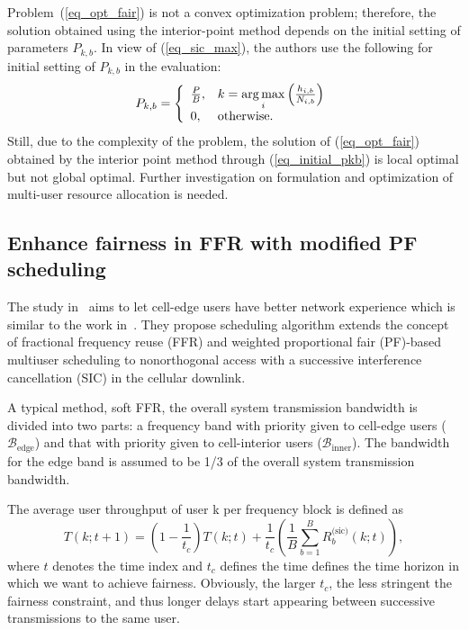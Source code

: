 Problem~(\ref{eq_opt_fair}) is not a convex optimization problem; therefore, the solution obtained using the interior-point method depends on the initial setting of parameters $P_{k,b}$. In view of (\ref{eq_sic_max}), the authors use the following for initial setting of $P_{k,b}$ in the evaluation:
\begin{equation}
\label{eq_initial_pkb}
 P_{k,b} = \left\{
  \begin{array}{l l}
    \frac{P}{B}, & k=\underset{i}{\arg\max} \left(\frac{h_{i,b}}{N_{i,b}}\right)\\
    0,     & \text{otherwise.}
  \end{array} \right.
\end{equation}
Still, due to the complexity of the problem, the solution of (\ref{eq_opt_fair}) obtained by the interior point method through (\ref{eq_initial_pkb}) is local optimal but not global optimal. Further investigation on formulation and optimization of multi-user resource allocation is needed.




\subsection{Enhance fairness in FFR with modified PF scheduling}

\label{sec_ffr_pf}
The study in~\cite{cite_docomo3} aims to let cell-edge users have better network experience 
which is similar to the work in~\cite{cite_docomo2}. 
They propose scheduling algorithm extends the concept of fractional frequency reuse (FFR) and 
weighted proportional fair (PF)-based multiuser scheduling to nonorthogonal access with a 
successive interference cancellation (SIC) in the cellular downlink. 

A typical method, soft FFR, the overall system transmission bandwidth is divided into two parts: 
a frequency band with priority given to cell-edge users ($\mathcal{B}_{\text{edge}}$) and that 
with priority given to cell-interior users ($\mathcal{B}_{\text{inner}}$). The bandwidth for the
edge band is assumed to be 1/3 of the overall system transmission bandwidth.

The average user throughput of user k per frequency block is defined as
\begin{equation}
\label{eq_avg_throughput}
T(k;t+1)=\left(1-\frac{1}{t_c}\right)T(k;t)+\frac{1}{t_c}\left(\frac{1}{B}\sum_{b=1}^{B} R^{\text{(sic)}}_b(k;t)\right),
\end{equation}
where $t$ denotes the time index and $t_c$ defines the time defines the time horizon in which we want
to achieve fairness. Obviously, the larger $t_c$, the less stringent
the fairness constraint, and thus longer delays start appearing
between successive transmissions to the same user.

